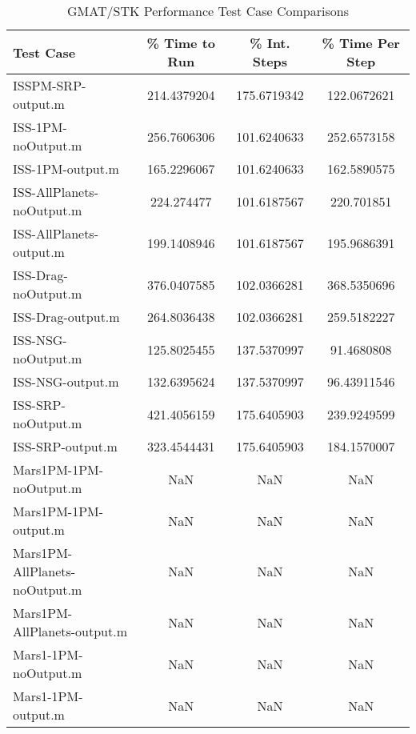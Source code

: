 \begin{table}[htbp!]
\centering
\caption{ GMAT/STK Performance Test Case Comparisons}
      \begin{tabular}{lccc}
      \hline\hline
          Test Case & \% Time to Run & \% Int. Steps & \% Time Per Step \\
         \hline
         ISSPM-SRP-output.m & 214.4379204 & 175.6719342 & 122.0672621 \\
         ISS-1PM-noOutput.m & 256.7606306 & 101.6240633 & 252.6573158 \\
         ISS-1PM-output.m & 165.2296067 & 101.6240633 & 162.5890575 \\
         ISS-AllPlanets-noOutput.m & 224.274477 & 101.6187567 & 220.701851 \\
         ISS-AllPlanets-output.m & 199.1408946 & 101.6187567 & 195.9686391 \\
         ISS-Drag-noOutput.m & 376.0407585 & 102.0366281 & 368.5350696 \\
         ISS-Drag-output.m & 264.8036438 & 102.0366281 & 259.5182227 \\
         ISS-NSG-noOutput.m & 125.8025455 & 137.5370997 & 91.4680808 \\
         ISS-NSG-output.m & 132.6395624 & 137.5370997 & 96.43911546 \\
         ISS-SRP-noOutput.m & 421.4056159 & 175.6405903 & 239.9249599 \\
         ISS-SRP-output.m & 323.4544431 & 175.6405903 & 184.1570007 \\
         Mars1PM-1PM-noOutput.m & NaN & NaN & NaN \\
         Mars1PM-1PM-output.m & NaN & NaN & NaN \\
         Mars1PM-AllPlanets-noOutput.m & NaN & NaN & NaN \\
         Mars1PM-AllPlanets-output.m & NaN & NaN & NaN \\
         Mars1-1PM-noOutput.m & NaN & NaN & NaN \\
         Mars1-1PM-output.m & NaN & NaN & NaN \\

\end{tabular}
\end{table}
